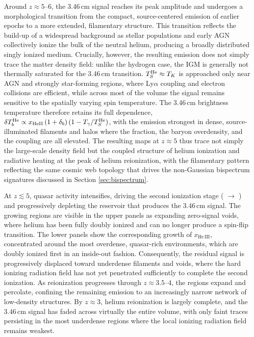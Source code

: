 \documentclass[apj,twocolumn, appendixfloats, twocolappendix, numberedappendix, tighten]{openjournal}
\begin{document}
Around $z \approx 5$--$6$, the 3.46\,cm signal reaches its peak amplitude and undergoes a morphological transition from the compact, source-centered emission of earlier epochs to a more extended, filamentary structure. This transition reflects the build-up of a widespread  background as stellar populations and early AGN collectively ionize the bulk of the neutral helium, producing a broadly distributed singly ionized medium. Crucially, however, the resulting emission does not simply trace the matter density field: unlike the hydrogen case, the IGM is generally not thermally saturated for the 3.46\,cm transition. $T_S^{\rm He} \approx T_K$ is approached only near AGN and strongly star-forming regions, where  Ly$\alpha$ coupling and electron collisions are efficient, while across most of the volume the signal remains sensitive to the spatially varying spin temperature. The 3.46\,cm brightness temperature therefore retains its full dependence, $\delta T_b^{\rm He} \propto x_{\rm HeII}\,(1+\delta_b)\,(1 - T_\gamma/T_S^{\rm He})$, with the emission strongest in dense, source-illuminated filaments and halos where the  fraction, the baryon overdensity, and the coupling are all elevated. The resulting maps at $z \approx 5$ thus trace not simply the large-scale density field but the coupled structure of helium ionization and radiative heating at the peak of helium reionization, with the filamentary pattern reflecting the same cosmic web topology that drives the non-Gaussian bispectrum signatures discussed in Section \ref{sec:bispectrum}.


At $z \lesssim 5$, quasar activity intensifies, driving the second ionization stage ( $\rightarrow$ ) and progressively depleting the  reservoir that produces the 3.46\,cm signal. The growing  regions are visible in the upper panels as expanding zero-signal voids, where helium has been fully doubly ionized and can no longer produce a spin-flip transition. The lower panels show the corresponding growth of $x_\mathrm{He\,III}$, concentrated around the most overdense, quasar-rich environments, which are doubly ionized first in an inside-out fashion. Consequently, the residual  signal is progressively displaced toward underdense filaments and voids, where the hard ionizing radiation field has not yet penetrated sufficiently to complete the second ionization. As reionization progresses through $z \approx 3.5$--$4$, the  regions expand and percolate, confining the remaining  emission to an increasingly narrow network of low-density structures. By $z \approx 3$, helium reionization is largely complete, and the 3.46\,cm signal has faded across virtually the entire volume, with only faint traces persisting in the most underdense regions where the local ionizing radiation field remains weakest.
\end{document}
